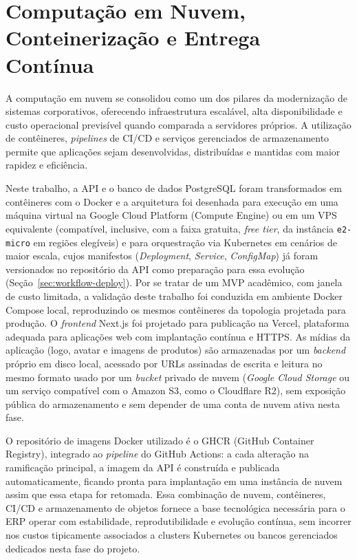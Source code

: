 \section{Computação em Nuvem, Conteinerização e Entrega Contínua}
A computação em nuvem se consolidou como um dos pilares da modernização de sistemas corporativos, oferecendo infraestrutura escalável, alta disponibilidade e custo operacional previsível quando comparada a servidores próprios. A utilização de contêineres, \textit{pipelines} de CI/CD e serviços gerenciados de armazenamento permite que aplicações sejam desenvolvidas, distribuídas e mantidas com maior rapidez e eficiência.

Neste trabalho, a API e o banco de dados PostgreSQL foram transformados em contêineres com o Docker e a arquitetura foi desenhada para execução em uma máquina virtual na Google Cloud Platform (Compute Engine) ou em um VPS equivalente (compatível, inclusive, com a faixa gratuita, \textit{free tier}, da instância \texttt{e2-micro} em regiões elegíveis) e para orquestração via Kubernetes em cenários de maior escala, cujos manifestos (\textit{Deployment}, \textit{Service}, \textit{ConfigMap}) já foram versionados no repositório da API como preparação para essa evolução (Seção~\ref{sec:workflow-deploy}). Por se tratar de um MVP acadêmico, com janela de custo limitada, a validação deste trabalho foi conduzida em ambiente Docker Compose local, reproduzindo os mesmos contêineres da topologia projetada para produção. O \textit{frontend} Next.js foi projetado para publicação na Vercel, plataforma adequada para aplicações web com implantação contínua e HTTPS. As mídias da aplicação (logo, avatar e imagens de produtos) são armazenadas por um \textit{backend} próprio em disco local, acessado por URLs assinadas de escrita e leitura no mesmo formato usado por um \textit{bucket} privado de nuvem (\textit{Google Cloud Storage} ou um serviço compatível com o Amazon S3, como o Cloudflare R2), sem exposição pública do armazenamento e sem depender de uma conta de nuvem ativa nesta fase.

O repositório de imagens Docker utilizado é o GHCR (GitHub Container Registry), integrado ao \textit{pipeline} do GitHub Actions: a cada alteração na ramificação principal, a imagem da API é construída e publicada automaticamente, ficando pronta para implantação em uma instância de nuvem assim que essa etapa for retomada. Essa combinação de nuvem, contêineres, CI/CD e armazenamento de objetos fornece a base tecnológica necessária para o ERP operar com estabilidade, reprodutibilidade e evolução contínua, sem incorrer nos custos tipicamente associados a clusters Kubernetes ou bancos gerenciados dedicados nesta fase do projeto.

